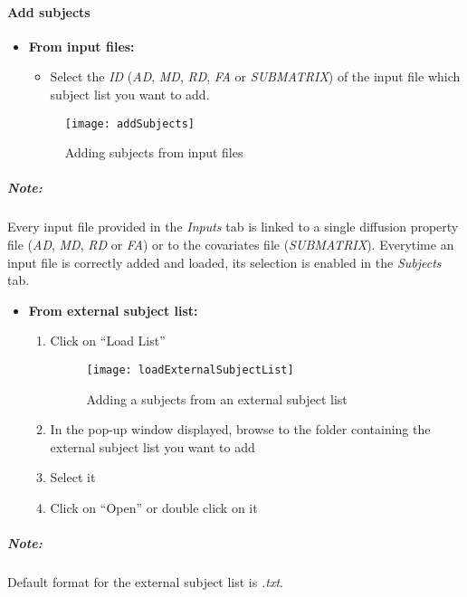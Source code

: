 \documentclass[fadttsterUserGuide_use]{subfiles}
\begin{document}
	\paragraph{Add subjects}	
	\begin{itemize}
		\item \textbf{From input files:}
		\begin{itemize}
			\item Select the \textit{ID} (\textit{AD}, \textit{MD}, \textit{RD}, \textit{FA} or \textit{SUBMATRIX}) of the input file which subject list you want to add.
		\end{itemize}
		\begin{figure}[H]
  			\texttt{[image: addSubjects]}
  			\caption{Adding subjects from input files}
    		\label{fig:addSubjectsFromFiles}
		\end{figure}
	\end{itemize}
	\subparagraph{\textbf{Note:}} Every input file provided in the \textit{Inputs} tab is linked to a single diffusion property file (\textit{AD}, \textit{MD}, \textit{RD} or \textit{FA}) or to the covariates file (\textit{SUBMATRIX}). Everytime an input file is correctly added and loaded, its selection is enabled in the \textit{Subjects} tab.
	\begin{itemize}
		\item \textbf{From external subject list:}
		\begin{enumerate}
			\item Click on ``Load List''
			\begin{figure}[H]
  				\texttt{[image: loadExternalSubjectList]}
  				\caption{Adding a subjects from an external subject list}
    			\label{fig:addSubjectsFromExternalList}
			\end{figure}
			\item In the pop-up window displayed, browse to the folder containing the external subject list you want to add
			\item Select it
			\item Click on ``Open'' or double click on it
		\end{enumerate}
	\end{itemize}
	\subparagraph{\textbf{Note:}} Default format for the external subject list is \textit{.txt}.
	
	
\end{document}
